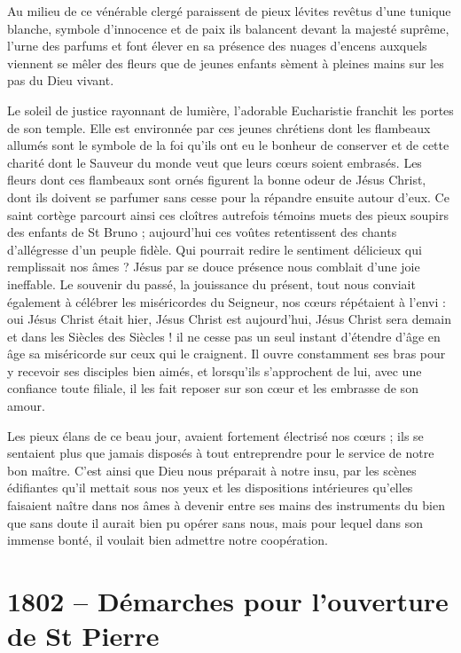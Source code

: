 \documentclass[11pt,a4paper]{report}
\begin{document}
Au milieu de ce vénérable clergé paraissent de pieux lévites revêtus d'une tunique blanche, symbole d'innocence et de paix ils balancent devant la majesté suprême, l'urne des parfums et font élever en sa présence des nuages d'encens auxquels viennent se mêler des fleurs que de jeunes enfants sèment à pleines mains sur les pas du Dieu vivant.

Le soleil de justice rayonnant de lumière, l'adorable Eucharistie franchit les portes de son temple. Elle est environnée par ces jeunes chrétiens dont les flambeaux allumés sont le symbole de la foi qu'ils ont eu le bonheur de conserver et de cette charité dont le Sauveur du monde veut que leurs cœurs soient embrasés. Les fleurs dont ces flambeaux sont ornés figurent la bonne odeur de Jésus Christ, dont ils doivent se parfumer sans cesse pour la répandre ensuite autour d'eux. Ce saint cortège parcourt ainsi ces cloîtres autrefois témoins muets des pieux soupirs des enfants de St Bruno ; aujourd'hui ces voûtes retentissent des chants d'allégresse d'un peuple fidèle. Qui pourrait redire le sentiment délicieux qui remplissait nos âmes ? Jésus par se douce présence nous comblait d'une joie ineffable. Le souvenir du passé, la jouissance du présent, tout nous conviait également à célébrer les miséricordes du Seigneur, nos cœurs répétaient à l'envi : oui Jésus Christ était hier, Jésus Christ est aujourd'hui, Jésus Christ sera demain et dans les Siècles des Siècles ! il ne cesse pas un seul instant d'étendre d'âge en âge sa miséricorde sur ceux qui le craignent. Il ouvre constamment ses bras pour y recevoir ses disciples bien aimés, et lorsqu'ils s'approchent de lui, avec une confiance toute filiale, il les fait reposer sur son cœur et les embrasse de son amour.

Les pieux élans de ce beau jour, avaient fortement électrisé nos cœurs ; ils se sentaient plus que jamais disposés à tout entreprendre pour le service de notre bon maître. C'est ainsi que Dieu nous préparait à notre insu, par les scènes édifiantes qu'il mettait sous nos yeux et les dispositions intérieures qu'elles faisaient naître dans nos âmes à devenir entre ses mains des instruments du bien que sans doute il aurait bien pu opérer sans nous, mais pour lequel dans son immense bonté, il voulait bien admettre notre coopération.

\section*{1802 -- Démarches pour l'ouverture de St Pierre}
\end{document}
